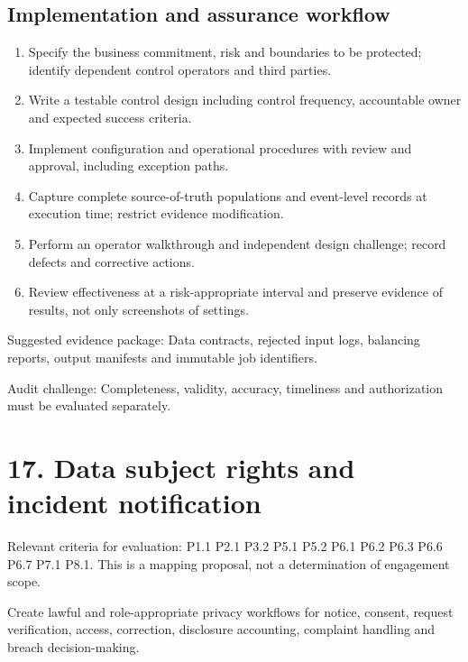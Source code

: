 \documentclass[10pt,oneside]{report}
\begin{document}
\subsection{Implementation and assurance workflow}
\begin{enumerate}
\item Specify the business commitment, risk and boundaries to be protected; identify dependent control operators and third parties.
\item Write a testable control design including control frequency, accountable owner and expected success criteria.
\item Implement configuration and operational procedures with review and approval, including exception paths.
\item Capture complete source-of-truth populations and event-level records at execution time; restrict evidence modification.
\item Perform an operator walkthrough and independent design challenge; record defects and corrective actions.
\item Review effectiveness at a risk-appropriate interval and preserve evidence of results, not only screenshots of settings.
\end{enumerate}

Suggested evidence package: Data contracts, rejected input logs, balancing reports, output manifests and immutable job identifiers.

Audit challenge: Completeness, validity, accuracy, timeliness and authorization must be evaluated separately.

\section{17. Data subject rights and incident notification}
Relevant criteria for evaluation: P1.1 P2.1 P3.2 P5.1 P5.2 P6.1 P6.2 P6.3 P6.6 P6.7 P7.1 P8.1. This is a mapping proposal, not a determination of engagement scope.

\begin{engineeringbox}
Create lawful and role-appropriate privacy workflows for notice, consent, request verification, access, correction, disclosure accounting, complaint handling and breach decision-making.
\end{engineeringbox}
\end{document}
